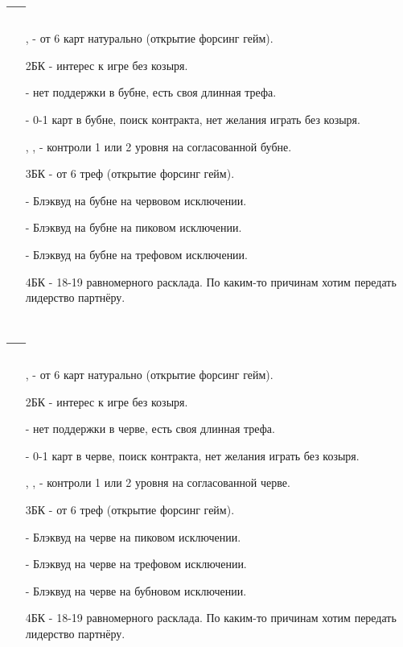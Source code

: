 \documentclass{article}
\begin{document}
\subsection{ --- }
\begin{enumerate}
    \item[\he{2}, \sp{2}] - от 6 карт натурально (открытие форсинг гейм).
    \item[2БК] - интерес к игре без козыря.
    \item[\cl{3}] - нет поддержки в бубне, есть своя длинная трефа.
    \item[\di{3}] - 0-1 карт в бубне, поиск контракта, нет желания играть без козыря.
    \item[\he{3}, \sp{3}, \cl{4}] - контроли 1 или 2 уровня на согласованной бубне.
    \item[3БК] - от 6 треф (открытие форсинг гейм).
    \item[\di{4}] - Блэквуд на бубне на червовом исключении.
    \item[\he{4}] - Блэквуд на бубне на пиковом исключении.
    \item[\sp{4}] - Блэквуд на бубне на трефовом исключении.
    \item[4БК] - 18-19 равномерного расклада. По каким-то причинам хотим передать лидерство партнёру.
\end{enumerate}
\subsection{ --- }
\begin{enumerate}
    \item[\sp{2}, \di{3}] - от 6 карт натурально (открытие форсинг гейм).
    \item[2БК] - интерес к игре без козыря.
    \item[\cl{3}] - нет поддержки в черве, есть своя длинная трефа.
    \item[\he{3}] - 0-1 карт в черве, поиск контракта, нет желания играть без козыря.
    \item[\sp{3}, \cl{4}, \di{4}] - контроли 1 или 2 уровня на согласованной черве.
    \item[3БК] - от 6 треф (открытие форсинг гейм).
    \item[\he{4}] - Блэквуд на черве на пиковом исключении.
    \item[\sp{4}] - Блэквуд на черве на трефовом исключении.
    \item[\cl{5}] - Блэквуд на черве на бубновом исключении.
    \item[4БК] - 18-19 равномерного расклада. По каким-то причинам хотим передать лидерство партнёру.
\end{enumerate}
\end{document}
